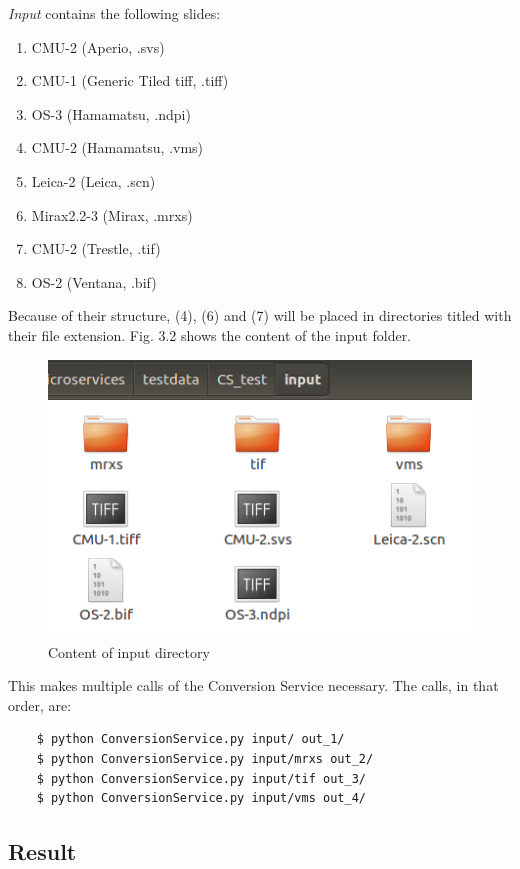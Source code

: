 \emph{Input} contains the following slides:

\begin{enumerate}[(1)]
	\item CMU-2 (Aperio, .svs)
	\item CMU-1 (Generic Tiled tiff, .tiff)
	\item OS-3 (Hamamatsu, .ndpi)
	\item CMU-2 (Hamamatsu, .vms)
	\item Leica-2 (Leica, .scn)
	\item Mirax2.2-3 (Mirax, .mrxs)
	\item CMU-2 (Trestle, .tif)
	\item OS-2 (Ventana, .bif)
\end{enumerate}

Because of their structure, (4), (6) and (7) will be placed in directories titled with their file extension. Fig. 3.2 shows the content of the input folder.

\begin{figure}[H]
	\begin{center}
		\includegraphics[scale=0.5]{img/inputDir.png}
		\caption{Content of input directory}
		\label{fig:fig3.2}
	\end{center}
\end{figure}

This makes multiple calls of the Conversion Service necessary. The calls, in that order, are:

\begin{lstlisting}
	$ python ConversionService.py input/ out_1/
	$ python ConversionService.py input/mrxs out_2/
	$ python ConversionService.py input/tif out_3/
	$ python ConversionService.py input/vms out_4/
\end{lstlisting}


\subsection{Result}

